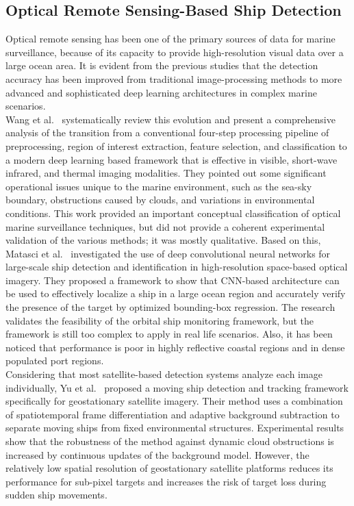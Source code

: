 \subsection{Optical Remote Sensing-Based Ship Detection}
Optical remote sensing has been one of the primary sources of data for marine surveillance, because of its capacity to provide high-resolution visual data over a large ocean area. It is evident from the previous studies that the detection accuracy has been improved from traditional image-processing methods to more advanced and sophisticated deep learning architectures in complex marine scenarios. \\

Wang et al.~\cite{jmse9121408} systematically review this evolution and present a comprehensive analysis of the transition from a conventional four-step processing pipeline of preprocessing, region of interest extraction, feature selection, and classification to a modern deep learning based framework that is effective in visible, short-wave infrared, and thermal imaging modalities. They pointed out some significant operational issues unique to the marine environment, such as the sea-sky boundary, obstructions caused by clouds, and variations in environmental conditions. This work provided an important conceptual classification of optical marine surveillance techniques, but did not provide a coherent experimental validation of the various methods; it was mostly qualitative.
Based on this, Matasci et al.~\cite{isprs-annals-V-3-2021-303-2021} investigated the use of deep convolutional neural networks for large-scale ship detection and identification in high-resolution space-based optical imagery. They proposed a framework to show that CNN-based architecture can be used to effectively localize a ship in a large ocean region and accurately verify the presence of the target by optimized bounding-box regression. The research validates the feasibility of the orbital ship monitoring framework, but the framework is still too complex to apply in real life scenarios. Also, it has been noticed that performance is poor in highly reflective coastal regions and in dense populated port regions.\\

Considering that most satellite-based detection systems analyze each image individually, Yu et al.~\cite{s21227547} proposed a moving ship detection and tracking framework specifically for geostationary satellite imagery. Their method uses a combination of spatiotemporal frame differentiation and adaptive background subtraction to separate moving ships from fixed environmental structures. Experimental results show that the robustness of the method against dynamic cloud obstructions is increased by continuous updates of the background model. However, the relatively low spatial resolution of geostationary satellite platforms reduces its performance for sub-pixel targets and increases the risk of target loss during sudden ship movements. \\

